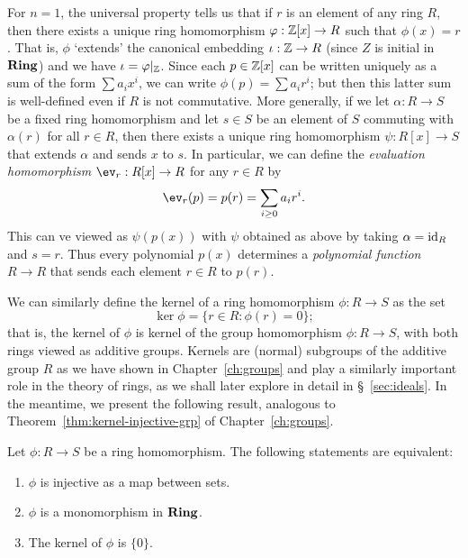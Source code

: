 For \(n = 1\), the universal property tells us that if \(r\) is an element of
any ring \(R\), then there exists a unique ring homomorphism \(\varphi: \mathbb{Z}[x] \to
R\) such that \(\phi(x) = r\). That is, \(\phi\) `extends' the canonical
embedding \(\iota: \mathbb{Z} \to R\) (since \(Z\) is initial in \(\mathbf{Ring}\)) and we have
\(\iota = \varphi{|_{\mathbb{Z}}}\). Since each \(p \in \mathbb{Z}[x]\) can be written uniquely as
a sum of the form \(\sum a_i x^i\), we can write \(\phi(p) = \sum a_i r^i\); but
then this latter sum is well-defined even if \(R\) is not commutative. More
generally, if we let \(\alpha: R \to S\) be a fixed ring homomorphism and let
\(s \in S\) be an element of \(S\) commuting with \(\alpha(r)\) for all \(r \in
R\), then there exists a unique ring homomorphism \(\psi: R[x] \to S\) that
extends \(\alpha\) and sends \(x\) to \(s\). In particular, we can define the
\emph{evaluation homomorphism} \(\ev_r: R[x] \to R\) for any \(r \in R\) by 
\[
    \ev_r(p) = p(r) = \sum_{i \geq 0} a_i r^i.
\]
This can ve viewed as \(\psi(p(x))\) with \(\psi\) obtained as above by taking
\(\alpha = \operatorname{id}_R\) and \(s = r\). Thus every polynomial \(p(x)\) determines a
\emph{polynomial function} \(R \to R\) that sends each element \(r \in R\) to
\(p(r)\).

We can similarly define the kernel of a ring homomorphism \(\phi: R \to S\) as
the set
\[
    \ker \phi = \{r \in R : \phi(r) = 0\};
\]
that is, the kernel of \(\phi\) is kernel of the group homomorphism \(\phi: R
\to S\), with both rings viewed as additive groups. Kernels are (normal)
subgroups of the additive group \(R\) as we have shown in
Chapter~\ref{ch:groups} and play a similarly important role in the theory of
rings, as we shall later explore in detail in \S~\ref{sec:ideals}. In the
meantime, we present the following result, analogous to
Theorem~\ref{thm:kernel-injective-grp} of Chapter~\ref{ch:groups}.

\begin{theorem}
    Let \(\phi: R \to S\) be a ring homomorphism. The following statements are
    equivalent:
    \begin{enumerate}[label=(\alph*)]
        \item \(\phi\) is injective as a map between sets.
        \item \(\phi\) is a monomorphism in \(\mathbf{Ring}\).
        \item The kernel of \(\phi\) is \(\{0\}\).
    \end{enumerate}
\end{theorem}

